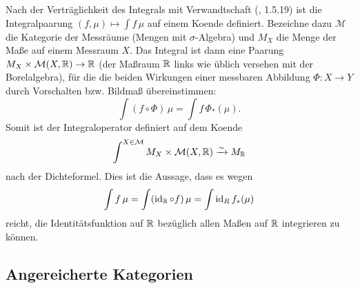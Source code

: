 \begin{bsp}
  Nach der Verträglichkeit des Integrals mit Verwandtschaft
  (\cite{AN3}, 1.5.19) ist die Integralpaarung $(f, \mu) \mapsto \int
  f \, \mu$ auf einem Koende definiert. Bezeichne dazu $\mathcal{M}$
  die Kategorie der Messräume (Mengen mit $\sigma$-Algebra) und $M_X$
  die Menge der Maße auf einem Messraum $X$. Das Integral ist dann
  eine Paarung $M_X \times \mathcal{M}(X, \mathbb{R}) \to \mathbb{R}$ (der Maßraum
  $\mathbb{R}$ links wie üblich versehen mit der Borelalgebra), für die die
  beiden Wirkungen einer messbaren Abbildung $\Phi: X \to Y$ durch
  Vorschalten bzw. Bildmaß übereinstimmen:
  \[ \int (f \circ \Phi) \, \mu = \int f \, \Phi_*(\mu). \]
  Somit ist der Integraloperator definiert auf dem Koende
  \[ \int^{X \in \mathcal{M}} M_X \times \mathcal{M}(X, \mathbb{R}) \xrightarrow[]{\sim} M_{\mathbb{R}} \]
  nach der Dichteformel. Dies ist die Aussage, dass es wegen
  \[ \int f \, \mu = \int (\operatorname{id}_{\mathbb{R}} \circ f) \, \mu = \int \operatorname{id}_R f_*(\mu) \]
  reicht, die Identitätsfunktion auf $\mathbb{R}$ bezüglich allen Maßen auf
  $\mathbb{R}$ integrieren zu können.
\end{bsp}

\subsection{Angereicherte Kategorien}

